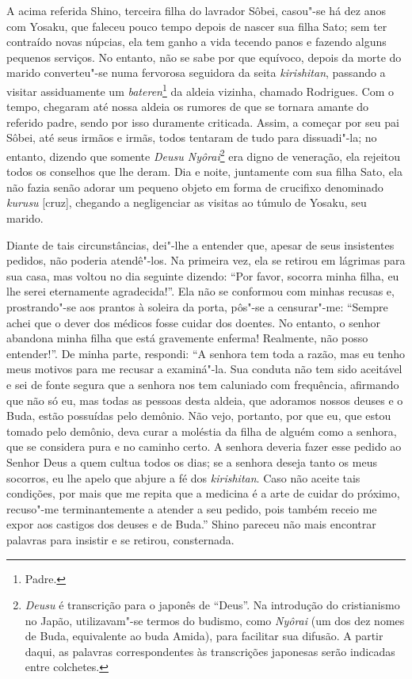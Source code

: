A acima referida Shino, terceira filha do lavrador Sôbei, casou"-se há
dez anos com Yosaku, que faleceu pouco tempo depois de nascer sua filha
Sato; sem ter contraído novas núpcias, ela tem ganho a vida tecendo
panos e fazendo alguns pequenos serviços. No entanto, não se sabe por
que equívoco, depois da morte do marido converteu"-se numa fervorosa
seguidora da seita \textit{kirishitan}, passando a visitar assiduamente
um \textit{bateren}\footnote{Padre.} da aldeia
vizinha, chamado Rodrigues. Com o tempo, chegaram até nossa aldeia os
rumores de que se tornara amante do referido padre, sendo por isso
duramente criticada. Assim, a começar por seu pai Sôbei, até seus
irmãos e irmãs, todos tentaram de tudo para dissuadi"-la; no entanto,
dizendo que somente \textit{Deusu Nyôrai}\footnote{\textit{Deusu} é transcrição para o japonês de ``Deus''. Na
introdução do cristianismo no Japão, utilizavam"-se termos do budismo,
como \textit{Nyôrai} (um dos dez nomes de Buda, equivalente ao buda
Amida), para facilitar sua difusão. A partir daqui, as palavras 
correspondentes às transcrições japonesas serão indicadas entre colchetes.} 
era digno de veneração,
ela rejeitou todos os conselhos que lhe deram. Dia e noite, juntamente
com sua filha Sato, ela não fazia senão adorar um pequeno objeto em
forma de crucifixo denominado \textit{kurusu} [cruz], 
chegando a negligenciar as visitas ao túmulo de Yosaku, seu marido.

Diante de tais circunstâncias, dei"-lhe a entender que, apesar de seus
insistentes pedidos, não poderia atendê"-los. Na primeira vez, ela se
retirou em lágrimas para sua casa, mas voltou no dia seguinte dizendo:
``Por favor, socorra minha filha, eu lhe serei eternamente agradecida!''. 
Ela não se conformou com minhas recusas e, prostrando"-se aos prantos à
soleira da porta, pôs"-se a censurar"-me: ``Sempre achei que o dever dos
médicos fosse cuidar dos doentes. No entanto, o senhor abandona minha
filha que está gravemente enferma! Realmente, não posso entender!''. De
minha parte, respondi: ``A senhora tem toda a razão, mas eu tenho meus
motivos para me recusar a examiná"-la. Sua conduta não tem sido
aceitável e sei de fonte segura que a senhora nos tem caluniado com
frequência, afirmando que não só eu, mas todas as pessoas desta aldeia,
que adoramos nossos deuses e o Buda, estão possuídas pelo demônio. Não
vejo, portanto, por que eu, que estou tomado pelo demônio, deva curar a
moléstia da filha de alguém como a senhora, que se considera pura e no
caminho certo. A senhora deveria fazer esse pedido ao Senhor Deus a
quem cultua todos os dias; se a senhora deseja tanto os meus socorros,
eu lhe apelo que abjure a fé dos \textit{kirishitan}. Caso não aceite
tais condições, por mais que me repita que a medicina é a arte de
cuidar do próximo, recuso"-me terminantemente a atender a seu pedido,
pois também receio me expor aos castigos dos deuses e de Buda.'' Shino
pareceu não mais encontrar palavras para insistir e se retirou, consternada.


